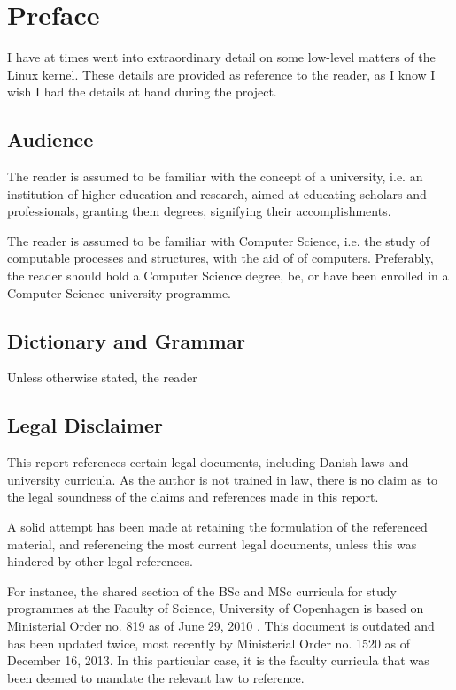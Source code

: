 
\chapter{Preface}

I have at times went into extraordinary detail on some low-level matters of the
Linux kernel. These details are provided as reference to the reader, as I know
I wish I had the details at hand during the project.

\section{Audience}

The reader is assumed to be familiar with the concept of a university, i.e. an
institution of higher education and research, aimed at educating scholars and
professionals, granting them degrees, signifying their accomplishments.

The reader is assumed to be familiar with Computer Science, i.e. the study of
computable processes and structures, with the aid of of computers. Preferably,
the reader should hold a Computer Science degree, be, or have been enrolled in
a Computer Science university programme.

\section{Dictionary and Grammar}

Unless otherwise stated, the reader

\section{Legal Disclaimer}

This report references certain legal documents, including Danish laws and
university curricula. As the author is not trained in law, there is no claim as
to the legal soundness of the claims and references made in this report.

A solid attempt has been made at retaining the formulation of the referenced
material, and referencing the most current legal documents, unless this was
hindered by other legal references.

For instance, the shared section of the BSc and MSc curricula for study
programmes at the Faculty of Science, University of
Copenhagen\cite{faelles-del-ENG} is based on Ministerial Order no. 819 as of
June 29, 2010 \cite{bek814}. This document is outdated and has been updated
twice, most recently by Ministerial Order no.  1520 as of December 16,
2013\cite{bek1520}. In this particular case, it is the faculty curricula that
was been deemed to mandate the relevant law to reference.

